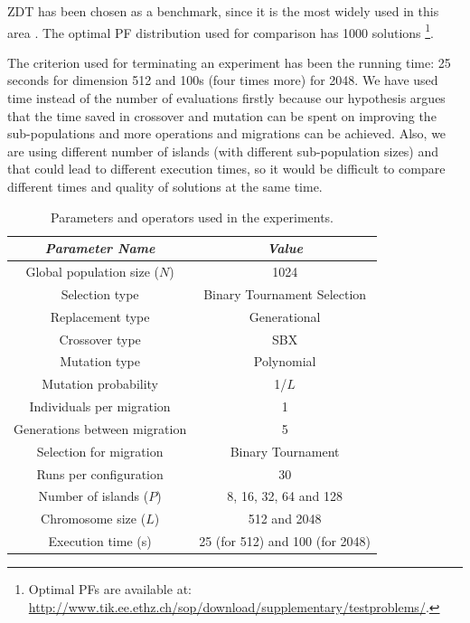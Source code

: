 \documentclass[preprint]{elsarticle}
\begin{document}
ZDT \citep{zdt2000a} has been chosen as a benchmark, since it is the most widely used in this area \citep{Deb03distributed,Martens13asynchronous,Wang09parallel,Durillo08masterslave}. The optimal PF distribution used for comparison has 1000 solutions \footnote{Optimal PFs are available at:   \url{http://www.tik.ee.ethz.ch/sop/download/supplementary/testproblems/}.}. 





The criterion used for terminating an experiment has been the running
time: 25 seconds for dimension 512 and 100s (four times more) for
2048. We have used time instead of the number of evaluations firstly
because our hypothesis argues that the time saved in crossover and
mutation can be spent on improving the sub-populations and more
operations and migrations can be achieved. Also, we are using
different number of islands (with different sub-population sizes) and that
could lead to different execution times, so it would be difficult to
compare different times and quality of solutions at the same time. 

\begin{table}
\begin{center}
\begin{tabular}{|c|c|}
\hline
{\em Parameter Name} & {\em Value} \\ \hline
Global population size ($N$) & 1024 \\ \hline
Selection type & Binary Tournament Selection \\ \hline
Replacement type & Generational \\ \hline 
Crossover type & SBX \\ \hline
Mutation  type & Polynomial\\ \hline
Mutation probability & 1/$L$ \\ \hline
Individuals per migration & 1 \\ \hline
Generations between migration & 5 \\ \hline
Selection for migration & Binary Tournament\\ \hline
Runs per configuration & 30 \\ \hline \hline
Number of islands ($P$) & 8, 16, 32, 64 and 128 \\ \hline
Chromosome size ($L$) & 512 and 2048 \\ \hline
Execution time (s) & 25 (for 512) and 100 (for 2048) \\ \hline \hline
\end{tabular}
\caption{Parameters and operators used in the experiments.}
\label{tab:parameters}
\end{center}
\end{table}
\end{document}
